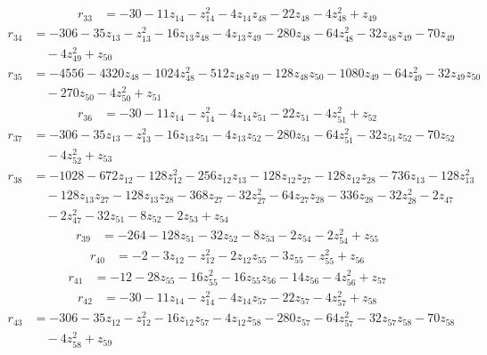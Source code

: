 \begin{align*}
r_{33} &=-30-11z_{14}-z_{14}^{2}-4z_{14}z_{48}-22z_{48}-4z_{48}^{2}+z_{49}
\end{align*}
\begin{align*}
r_{34} &=-306-35z_{13}-z_{13}^{2}-16z_{13}z_{48}-4z_{13}z_{49}-280z_{48}-64z_{48}^{2}-32z_{48}z_{49}-70z_{49}\\
&\quad -4z_{49}^{2}+z_{50}
\end{align*}
\begin{align*}
r_{35} &=-4556-4320z_{48}-1024z_{48}^{2}-512z_{48}z_{49}-128z_{48}z_{50}-1080z_{49}-64z_{49}^{2}-32z_{49}z_{50}\\
&\quad -270z_{50}-4z_{50}^{2}+z_{51}
\end{align*}
\begin{align*}
r_{36} &=-30-11z_{14}-z_{14}^{2}-4z_{14}z_{51}-22z_{51}-4z_{51}^{2}+z_{52}
\end{align*}
\begin{align*}
r_{37} &=-306-35z_{13}-z_{13}^{2}-16z_{13}z_{51}-4z_{13}z_{52}-280z_{51}-64z_{51}^{2}-32z_{51}z_{52}-70z_{52}\\
&\quad -4z_{52}^{2}+z_{53}
\end{align*}
\begin{align*}
r_{38} &=-1028-672z_{12}-128z_{12}^{2}-256z_{12}z_{13}-128z_{12}z_{27}-128z_{12}z_{28}-736z_{13}-128z_{13}^{2}\\
&\quad -128z_{13}z_{27}-128z_{13}z_{28}-368z_{27}-32z_{27}^{2}-64z_{27}z_{28}-336z_{28}-32z_{28}^{2}-2z_{47}\\
&\quad -2z_{47}^{2}-32z_{51}-8z_{52}-2z_{53}+z_{54}
\end{align*}
\begin{align*}
r_{39} &=-264-128z_{51}-32z_{52}-8z_{53}-2z_{54}-2z_{54}^{2}+z_{55}
\end{align*}
\begin{align*}
r_{40} &=-2-3z_{12}-z_{12}^{2}-2z_{12}z_{55}-3z_{55}-z_{55}^{2}+z_{56}
\end{align*}
\begin{align*}
r_{41} &=-12-28z_{55}-16z_{55}^{2}-16z_{55}z_{56}-14z_{56}-4z_{56}^{2}+z_{57}
\end{align*}
\begin{align*}
r_{42} &=-30-11z_{14}-z_{14}^{2}-4z_{14}z_{57}-22z_{57}-4z_{57}^{2}+z_{58}
\end{align*}
\begin{align*}
r_{43} &=-306-35z_{12}-z_{12}^{2}-16z_{12}z_{57}-4z_{12}z_{58}-280z_{57}-64z_{57}^{2}-32z_{57}z_{58}-70z_{58}\\
&\quad -4z_{58}^{2}+z_{59}
\end{align*}
